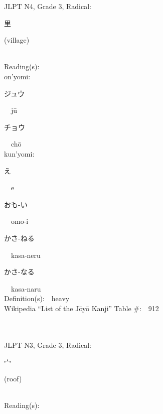 \begin{multicols}{2}
{JLPT N4, Grade 3, Radical:\ \ {\begin{CJK}{UTF8}{min} 里 \end{CJK}} (village) } \\
Reading(s):\ \ \\
{\hspace*{1em}}on'yomi:\ \ \\
{\hspace*{2em}}{\begin{CJK}{UTF8}{min} ジュウ \end{CJK}}\ \ j\=u\ \ \\
{\hspace*{2em}}{\begin{CJK}{UTF8}{min} チョウ \end{CJK}}\ \ ch\=o\ \ \\
{\hspace*{1em}}kun'yomi:\ \ \\
{\hspace*{2em}}{\begin{CJK}{UTF8}{min} え \end{CJK}}\ \ e\ \ \\
{\hspace*{2em}}{\begin{CJK}{UTF8}{min} おも-い \end{CJK}}\ \ omo-i\ \ \\
{\hspace*{2em}}{\begin{CJK}{UTF8}{min} かさ-ねる \end{CJK}}\ \ kasa-neru\ \ \\
{\hspace*{2em}}{\begin{CJK}{UTF8}{min} かさ-なる \end{CJK}}\ \ kasa-naru\ \ \\
Definition(s):\ \ heavy \\
Wikipedia ``List of the J\=oy\=o Kanji'' Table \#:\ \ 912 \\
\ \ \\
{\fontsize{34pt}{40pt}  }\ \ \\  %
{JLPT N3, Grade 3, Radical:\ \ {\begin{CJK}{UTF8}{min} 宀 \end{CJK}} (roof) } \\
Reading(s):\ \ \\

\end{multicols}
